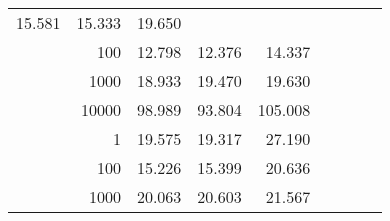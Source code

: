 \begin{table}
\begin{tabular}{rrrrrrrrr}
						
							    
							    
	                           15.581 & 15.333 & 19.650  \\
	                
	            
					 &  
					 
					\multirow{ 1 }{*}{ 100 } &
					
						
							    
							    
	                           12.798 & 12.376 & 14.337  \\
	                
	            
					 &  
					 
					\multirow{ 1 }{*}{ 1000 } &
					
						
							    
							    
	                           18.933 & 19.470 & 19.630  \\
	                
	            
					 &  
					 
					\multirow{ 1 }{*}{ 10000 } &
					
						
							    
							    
	                           98.989 & 93.804 & 105.008  \\
	                
	            
	        
				\noalign{\smallskip}\hline
				\multirow{ 4 }{*}{ 1000000 } &
				
					
					 
					\multirow{ 1 }{*}{ 1 } &
					
						
							    
							    
	                           19.575 & 19.317 & 27.190  \\
	                
	            
					 &  
					 
					\multirow{ 1 }{*}{ 100 } &
					
						
							    
							    
	                           15.226 & 15.399 & 20.636  \\
	                
	            
					 &  
					 
					\multirow{ 1 }{*}{ 1000 } &
					
						
							    
							    
	                           20.063 & 20.603 & 21.567  \\
	                

\end{tabular}
\end{table}
